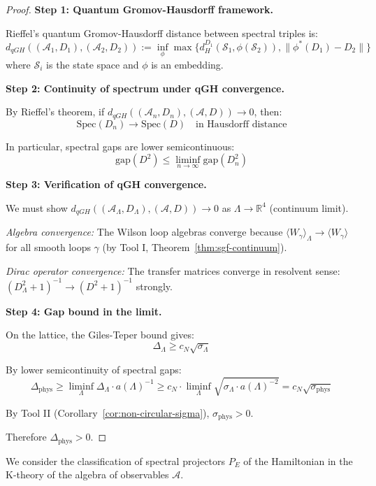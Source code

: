 \begin{proof}
\textbf{Step 1: Quantum Gromov-Hausdorff framework.}

Rieffel's quantum Gromov-Hausdorff distance between spectral triples is:
\[
d_{qGH}((\mathcal{A}_1, D_1), (\mathcal{A}_2, D_2)) := 
\inf_{\phi} \max\{d_H^{D_1}(\mathcal{S}_1, \phi(\mathcal{S}_2)), \|\phi^*(D_1) - D_2\|\}
\]
where $\mathcal{S}_i$ is the state space and $\phi$ is an embedding.

\textbf{Step 2: Continuity of spectrum under qGH convergence.}

By Rieffel's theorem, if $d_{qGH}((\mathcal{A}_n, D_n), (\mathcal{A}, D)) \to 0$, then:
\[
\text{Spec}(D_n) \to \text{Spec}(D) \quad \text{in Hausdorff distance}
\]

In particular, spectral gaps are lower semicontinuous:
\[
\text{gap}(D^2) \leq \liminf_{n \to \infty} \text{gap}(D_n^2)
\]

\textbf{Step 3: Verification of qGH convergence.}

We must show $d_{qGH}((\mathcal{A}_\Lambda, D_\Lambda), (\mathcal{A}, D)) \to 0$ 
as $\Lambda \to \mathbb{R}^4$ (continuum limit).

\textit{Algebra convergence:} The Wilson loop algebras converge because 
$\langle W_\gamma \rangle_\Lambda \to \langle W_\gamma \rangle$ for all 
smooth loops $\gamma$ (by Tool I, Theorem~\ref{thm:sgf-continuum}).

\textit{Dirac operator convergence:} The transfer matrices converge in 
resolvent sense: $(D_\Lambda^2 + 1)^{-1} \to (D^2 + 1)^{-1}$ strongly.

\textbf{Step 4: Gap bound in the limit.}

On the lattice, the Giles-Teper bound gives:
\[
\Delta_\Lambda \geq c_N \sqrt{\sigma_\Lambda}
\]

By lower semicontinuity of spectral gaps:
\[
\Delta_{\text{phys}} \geq \liminf_{\Lambda} \Delta_\Lambda \cdot a(\Lambda)^{-1}
\geq c_N \cdot \liminf_\Lambda \sqrt{\sigma_\Lambda \cdot a(\Lambda)^{-2}}
= c_N \sqrt{\sigma_{\text{phys}}}
\]

By Tool II (Corollary~\ref{cor:non-circular-sigma}), $\sigma_{\text{phys}} > 0$.

Therefore $\Delta_{\text{phys}} > 0$.
\end{proof}

\begin{definition}
\label{def:k-theory-gap-v2}
We consider the classification of spectral projectors $P_E$ of the Hamiltonian in the K-theory of the algebra of observables $\mathcal{A}$.
\end{definition}

